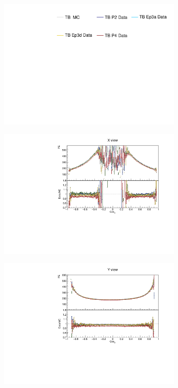 \begin{figure}[!ht]
  \begin{subfigure}{\textwidth}
  \centering
    \includegraphics[height=0.2\linewidth]{essentialsec_tb/legend.pdf}
  \end{subfigure}
  \vspace*{2mm}

  \begin{subfigure}{0.495\textwidth}
    \includegraphics[width=\linewidth]{PlotsAngularDistribution/pe_cosx_x.pdf}
  \end{subfigure}
  \begin{subfigure}{0.495\textwidth}
    \includegraphics[width=\linewidth]{PlotsAngularDistribution/pe_cosx_y.pdf}

\end{subfigure}
\end{figure}
